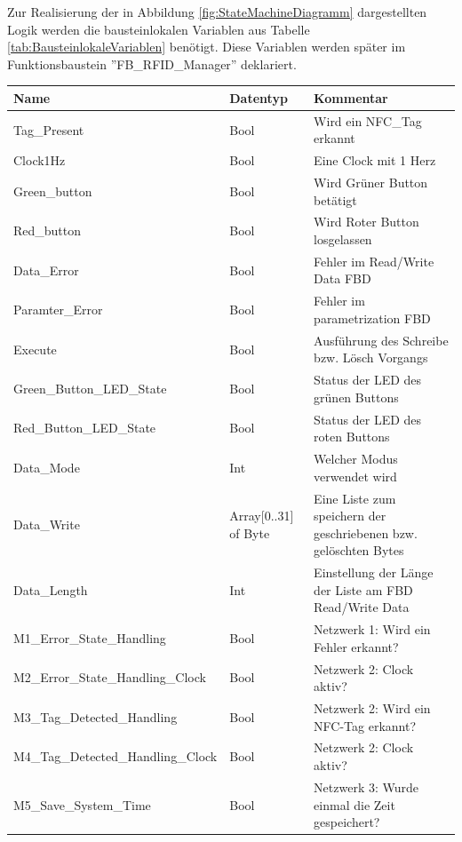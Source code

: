 Zur Realisierung der in Abbildung \ref{fig:StateMachineDiagramm} dargestellten Logik werden die bausteinlokalen Variablen aus Tabelle \ref{tab:BausteinlokaleVariablen} benötigt. Diese Variablen werden später im Funktionsbaustein ''FB\_RFID\_Manager'' deklariert.

\begin{table}[h!]
	\centering
	\renewcommand{\arraystretch}{1.0} %
	\footnotesize
	\begin{tabular}{|l|p{1.7cm}|p{5.6cm}|} %
		\hline
		\textbf{Name} & \textbf{Datentyp}  & \textbf{Kommentar} \\ \hline
		Tag\_Present & Bool & Wird ein NFC\_Tag erkannt \\ \hline
		Clock1Hz & Bool & Eine Clock mit 1 Herz \\ \hline
		Green\_button & Bool & Wird Grüner Button betätigt \\ \hline
		Red\_button & Bool & Wird Roter Button losgelassen \\ \hline
		Data\_Error & Bool & Fehler im Read/Write Data FBD \\ \hline
		Paramter\_Error & Bool & Fehler im parametrization FBD \\ \hline
		Execute & Bool & Ausführung des Schreibe bzw. Lösch Vorgangs \\ \hline
		Green\_Button\_LED\_State & Bool & Status der LED des grünen Buttons \\ \hline
		Red\_Button\_LED\_State & Bool & Status der LED des roten Buttons \\ \hline
		Data\_Mode & Int & Welcher Modus verwendet wird \\ \hline
		Data\_Write & Array[0..31] of Byte & Eine Liste zum speichern der geschriebenen bzw. gelöschten Bytes \\ \hline
		Data\_Length & Int & Einstellung der Länge der Liste am FBD Read/Write Data \\ \hline
		M1\_Error\_State\_Handling & Bool & Netzwerk 1: Wird ein Fehler erkannt? \\ \hline
		M2\_Error\_State\_Handling\_Clock & Bool & Netzwerk 2: Clock aktiv? \\ \hline
		M3\_Tag\_Detected\_Handling & Bool & Netzwerk 2: Wird ein NFC-Tag erkannt? \\ \hline
		M4\_Tag\_Detected\_Handling\_Clock & Bool & Netzwerk 2: Clock aktiv? \\ \hline
		M5\_Save\_System\_Time & Bool & Netzwerk 3: Wurde einmal die Zeit gespeichert? \\ \hline

\end{tabular}
\end{table}
